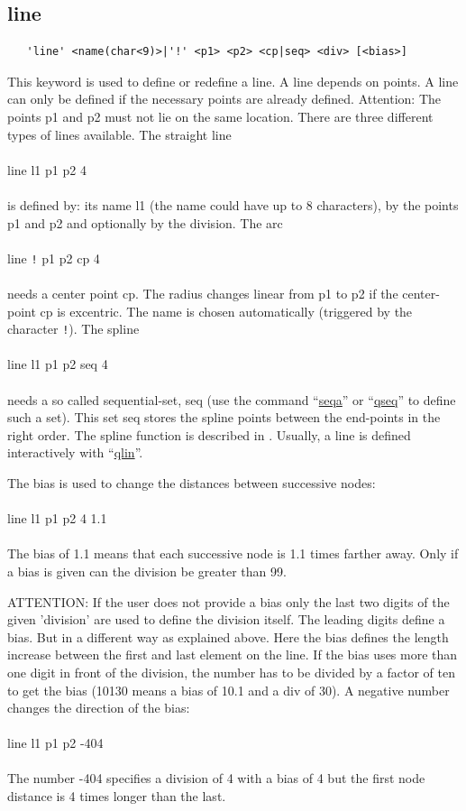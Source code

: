 \documentclass{article}
\providecommand{\htmlref}[2]{\hyperref[#2]{#1}}
\begin{document}
\subsection{\label{line}line}
\begin{verbatim}
   'line' <name(char<9)>|'!' <p1> <p2> <cp|seq> <div> [<bias>] 
\end{verbatim}
This keyword is used to define or redefine a line. A line depends on points. A line can only be defined if the necessary points are already defined. Attention: The points p1 and p2 must not lie on the same location. There are three different types of lines available. The straight line\\\\
line l1 p1 p2 4\\\\
is defined by: its name l1 (the name could have up to 8 characters), by the points p1 and p2 and optionally by the division. The arc\\\\
line \verb_!_ p1 p2 cp 4\\\\
needs a center point cp. The radius changes linear from p1 to p2 if the center-point cp is excentric. The name is chosen automatically (triggered by the character \verb_!_). The spline\\\\
line l1 p1 p2 seq 4\\\\
needs a so called sequential-set, seq (use the command ``\htmlref{seqa}{seqa}'' or ``\htmlref{qseq}{qseq}'' to define such a set). This set seq stores the spline points between the end-points in the right order. The spline function is described in \cite{spline}. Usually, a line is defined interactively with ``\htmlref{qlin}{qlin}''.

The bias is used to change the distances between successive nodes:\\\\
line l1 p1 p2 4 1.1\\\\
The bias of 1.1 means that each successive node is 1.1 times farther away. Only if a bias is given can the division be greater than 99.

ATTENTION: If the user does not provide a bias only the last two digits of the given 'division' are used to define the division itself. The leading digits define a bias. But in a different way as explained above. Here the bias defines the length increase between the first and last element on the line. If the bias uses more than one digit in front of the division, the number has to be divided by a factor of ten to get the bias (10130 means a bias of 10.1 and a div of 30). A negative number changes the direction of the bias:\\\\
line l1 p1 p2 -404\\\\The number -404 specifies a division of 4 with a bias of 4 but the first node distance is 4 times longer than the last.
 
\end{document}
